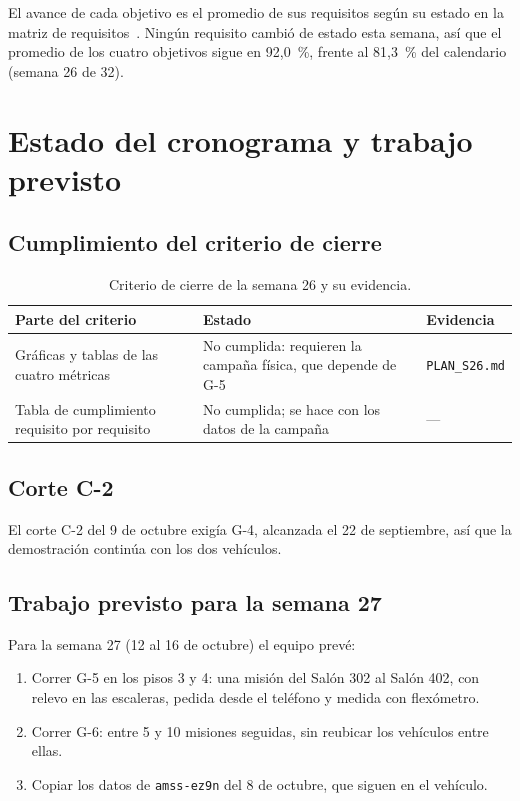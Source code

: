 \documentclass[12pt,letterpaper]{article}
\begin{document}
El avance de cada objetivo es el promedio de sus requisitos según su estado en la matriz de requisitos~\cite{estado}. Ningún requisito cambió de estado esta semana, así que el promedio de los cuatro objetivos sigue en 92,0~\%, frente al 81,3~\% del calendario (semana 26 de 32).

\section{Estado del cronograma y trabajo previsto}
\label{sec:cronograma}

\subsection{Cumplimiento del criterio de cierre}

\begin{table}[H]
    \centering
    \small
    \caption{Criterio de cierre de la semana 26 y su evidencia.}
    \label{tab:cierre}
    \begin{tabular}{@{}p{5.4cm}p{6.0cm}p{2.6cm}@{}}
        \toprule
        \textbf{Parte del criterio} & \textbf{Estado} & \textbf{Evidencia} \\ \midrule
        Gráficas y tablas de las cuatro métricas & No cumplida: requieren la campaña física, que depende de G-5 & \texttt{PLAN\_S26.md} \\ \addlinespace
        Tabla de cumplimiento requisito por requisito & No cumplida; se hace con los datos de la campaña & --- \\ \bottomrule
    \end{tabular}
\end{table}

\subsection{Corte C-2}

El corte C-2 del 9 de octubre exigía G-4, alcanzada el 22 de septiembre, así que la demostración continúa con los dos vehículos.

\subsection{Trabajo previsto para la semana 27}

Para la semana 27 (12 al 16 de octubre) el equipo prevé:

\begin{enumerate}[leftmargin=*]
    \item Correr G-5 en los pisos 3 y 4: una misión del Salón 302 al Salón 402, con relevo en las escaleras, pedida desde el teléfono y medida con flexómetro.
    \item Correr G-6: entre 5 y 10 misiones seguidas, sin reubicar los vehículos entre ellas.
    \item Copiar los datos de \texttt{amss-ez9n} del 8 de octubre, que siguen en el vehículo.
\end{enumerate}
\end{document}
